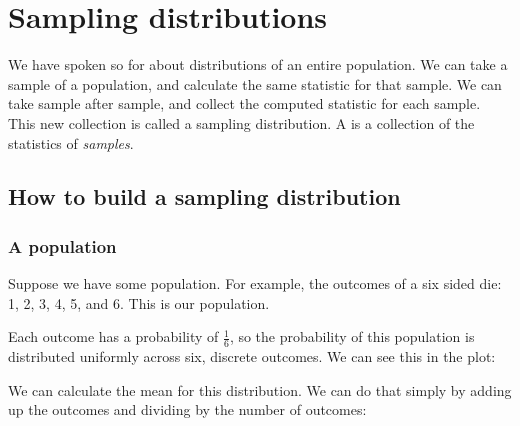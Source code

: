 \documentclass[../../../main.tex]{subfiles}
\begin{document}
\chapter{Sampling distributions}

We have spoken so for about distributions of an entire population. We can take a sample of a population, and calculate the same statistic for that sample. We can take sample after sample, and collect the computed statistic for each sample. This new collection is called a sampling distribution. A  is a collection of the statistics of \emph{samples}. 


\section{How to build a sampling distribution}


\subsection{A population}

Suppose we have some population. For example, the outcomes of a six sided die: 1, 2, 3, 4, 5, and 6. This is our population. 

Each outcome has a probability of $\frac{1}{6}$, so the probability of this population is distributed uniformly across six, discrete outcomes. We can see this in the plot:

\begin{center}
\end{center}

\noindent
We can calculate the mean for this distribution. We can do that simply by adding up the outcomes and dividing by the number of outcomes:
\end{document}

